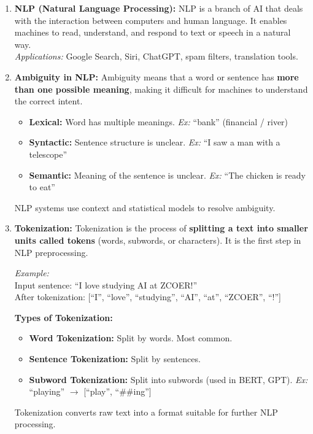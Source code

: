 \documentclass[12pt,a4paper]{article}
\newcommand{\term}[1]{\textbf{\color{headingcolor}#1}}
\begin{document}
\begin{answerenv}

\begin{enumerate}[leftmargin=1.8em, itemsep=8pt]
  \item \term{NLP (Natural Language Processing):}
  NLP is a branch of AI that deals with the interaction between computers and human language. It enables machines to read, understand, and respond to text or speech in a natural way.\\
  \textit{Applications:} Google Search, Siri, ChatGPT, spam filters, translation tools.

  \vspace{4pt}
  \item \term{Ambiguity in NLP:}
  Ambiguity means that a word or sentence has \textbf{more than one possible meaning}, making it difficult for machines to understand the correct intent.
  \begin{itemize}[leftmargin=1.5em, itemsep=2pt]
    \item \term{Lexical:} Word has multiple meanings. \textit{Ex:} ``bank'' (financial / river)
    \item \term{Syntactic:} Sentence structure is unclear. \textit{Ex:} ``I saw a man with a telescope''
    \item \term{Semantic:} Meaning of the sentence is unclear. \textit{Ex:} ``The chicken is ready to eat''
  \end{itemize}
  NLP systems use context and statistical models to resolve ambiguity.

  \vspace{4pt}
  \item \term{Tokenization:}
  Tokenization is the process of \textbf{splitting a text into smaller units called tokens} (words, subwords, or characters). It is the first step in NLP preprocessing.

  \textit{Example:}\\
  Input sentence: ``I love studying AI at ZCOER!''\\
  After tokenization: [``I'', ``love'', ``studying'', ``AI'', ``at'', ``ZCOER'', ``!'']

  \textbf{Types of Tokenization:}
  \begin{itemize}[leftmargin=1.5em, itemsep=2pt]
    \item \term{Word Tokenization:} Split by words. Most common.
    \item \term{Sentence Tokenization:} Split by sentences.
    \item \term{Subword Tokenization:} Split into subwords (used in BERT, GPT). \textit{Ex:} ``playing'' $\to$ [``play'', ``\#\#ing'']
  \end{itemize}
  Tokenization converts raw text into a format suitable for further NLP processing.
\end{enumerate}

\end{answerenv}
\end{document}
